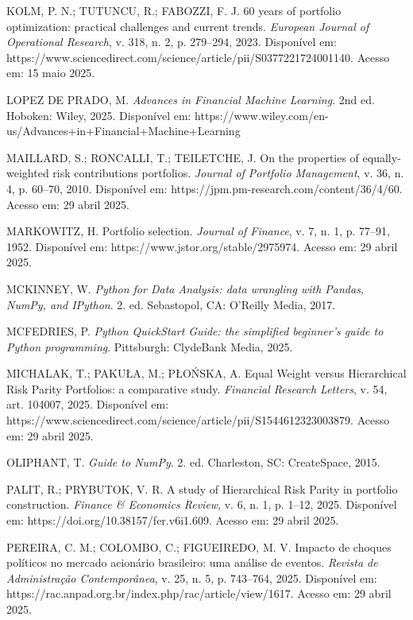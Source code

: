 \begin{thebibliography}{99}
KOLM, P. N.; TUTUNCU, R.; FABOZZI, F. J. 60 years of portfolio optimization: practical challenges and current trends. \textit{European Journal of Operational Research}, v. 318, n. 2, p. 279--294, 2023. Disponível em: https://www.sciencedirect.com/science/article/pii/S0377221724001140. Acesso em: 15 maio 2025.

LOPEZ DE PRADO, M. \textit{Advances in Financial Machine Learning}. 2nd ed. Hoboken: Wiley, 2025. Disponível em: https://www.wiley.com/en-us/Advances+in+Financial+Machine+Learning%

MAILLARD, S.; RONCALLI, T.; TEILETCHE, J. On the properties of equally-weighted risk contributions portfolios. \textit{Journal of Portfolio Management}, v. 36, n. 4, p. 60--70, 2010. Disponível em: https://jpm.pm-research.com/content/36/4/60. Acesso em: 29 abril 2025.

MARKOWITZ, H. Portfolio selection. \textit{Journal of Finance}, v. 7, n. 1, p. 77--91, 1952. Disponível em: https://www.jstor.org/stable/2975974. Acesso em: 29 abril 2025.

MCKINNEY, W. \textit{Python for Data Analysis: data wrangling with Pandas, NumPy, and IPython}. 2. ed. Sebastopol, CA: O'Reilly Media, 2017.

MCFEDRIES, P. \textit{Python QuickStart Guide: the simplified beginner's guide to Python programming}. Pittsburgh: ClydeBank Media, 2025.

MICHALAK, T.; PAKUŁA, M.; PŁOŃSKA, A. Equal Weight versus Hierarchical Risk Parity Portfolios: a comparative study. \textit{Financial Research Letters}, v. 54, art. 104007, 2025. Disponível em: https://www.sciencedirect.com/science/article/pii/S1544612323003879. Acesso em: 29 abril 2025.

OLIPHANT, T. \textit{Guide to NumPy}. 2. ed. Charleston, SC: CreateSpace, 2015.

PALIT, R.; PRYBUTOK, V. R. A study of Hierarchical Risk Parity in portfolio construction. \textit{Finance \& Economics Review}, v. 6, n. 1, p. 1--12, 2025. Disponível em: https://doi.org/10.38157/fer.v6i1.609. Acesso em: 29 abril 2025.

PEREIRA, C. M.; COLOMBO, C.; FIGUEIREDO, M. V. Impacto de choques políticos no mercado acionário brasileiro: uma análise de eventos. \textit{Revista de Administração Contemporânea}, v. 25, n. 5, p. 743--764, 2025. Disponível em: https://rac.anpad.org.br/index.php/rac/article/view/1617. Acesso em: 29 abril 2025.


\end{thebibliography}
